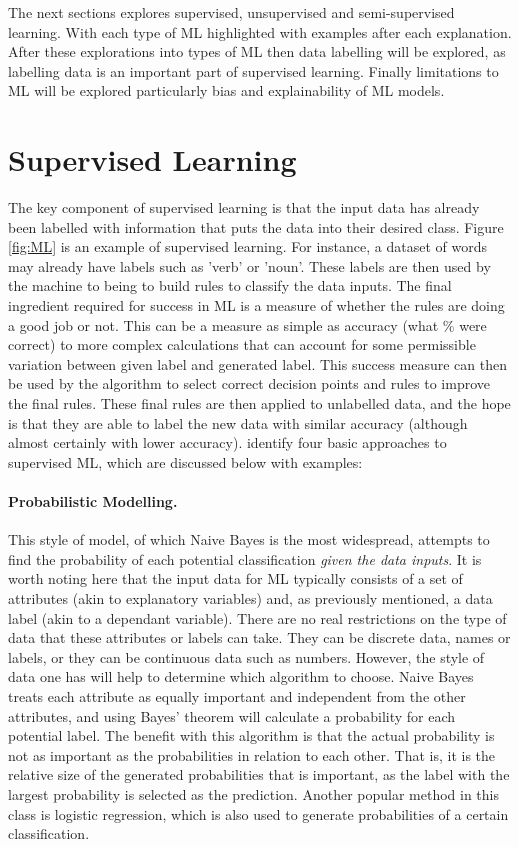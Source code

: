 The next sections explores supervised, unsupervised and semi-supervised learning. With each type of ML highlighted with examples after each explanation. After these explorations into types of ML then data labelling will be explored, as labelling data is an important part of supervised learning. Finally limitations to ML will be explored particularly bias and explainability of ML models. 

\section{Supervised Learning} The key component of supervised learning is that the input data has already been labelled with information that puts the data into their desired class.  Figure \ref{fig:ML} is an example of supervised learning. For instance, a dataset of words may already have labels such as ’verb’ or ’noun’. These labels are then used by the machine to being to build rules to classify the data inputs. The final ingredient required for success in ML is a measure of whether the rules are doing a good job or not. This can be a measure as simple as accuracy (what \% were correct) to more complex calculations that can account for some permissible variation between given label and generated label. This success measure can then be used by the algorithm to select correct decision points and rules to improve the final rules. These final rules are then applied to unlabelled data, and the hope is that they are able to label the new data with similar accuracy (although almost certainly with lower accuracy). \textcite{chollet_allaire_2018} identify four basic approaches to supervised ML, which are discussed below with examples:

\paragraph{Probabilistic Modelling.} This style of model, of which Naive Bayes is the most widespread, attempts to find the probability of each potential classification \emph{given the data inputs}. It is worth noting here that the input data for ML typically consists of a set of attributes (akin to explanatory variables) and, as previously mentioned, a data label (akin to a dependant variable). There are no real restrictions on the type of data that these attributes or labels can take. They can be discrete data, names or labels, or they can be continuous data such as numbers. However, the style of data one has will help to determine which algorithm to choose. Naive Bayes treats each attribute as equally important and independent from the other attributes, and using Bayes’ theorem will calculate a probability for each potential label. The benefit with this algorithm is that the actual probability is not as important as the probabilities in relation to each other. That is, it is the relative size of the generated probabilities that is important, as the label with the largest probability is selected as the prediction. Another popular method in this class is logistic regression, which is also used to generate probabilities of a certain classification.

